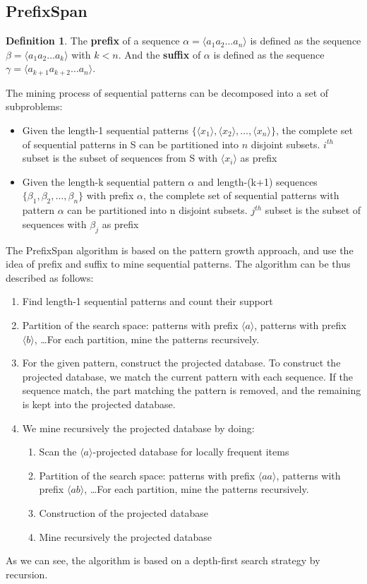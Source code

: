 \documentclass[12pt, openany]{report}
\theoremstyle{definition}
\newtheorem{definition}[thm]{Definition}
\begin{document}
\subsection{PrefixSpan} 
\begin{definition}
    The \textbf{prefix} of a sequence $\alpha = \langle a_1a_2 \dots a_n\rangle$ is defined as the sequence $\beta = \langle a_1a_2 \dots a_k\rangle$ with $k < n$. And the \textbf{suffix} of $\alpha$ is defined as the sequence $\gamma = \langle a_{k+1}a_{k+2} \dots a_n\rangle$.
\end{definition}
The mining process of sequential patterns can be decomposed into a set of subproblems: 
\begin{itemize}
    \item Given the length-1 sequential patterns $\{\langle x_1 \rangle, \langle x_2 \rangle, \dots, \langle x_n \rangle\}$, the complete set of sequential patterns in S can be partitioned into $n$ disjoint subsets. $i^{th}$ subset is the subset of sequences from S with $\langle x_i \rangle$ as prefix
    \item Given the length-k sequential pattern $\alpha$ and length-(k+1) sequences $\{\beta_1, \beta_2, \dots, \beta_n\}$ with prefix $\alpha$, the complete set of sequential patterns with pattern $\alpha$ can be partitioned into n disjoint subsets. $j^{th}$ subset is the subset of sequences with $\beta_j$ as prefix
\end{itemize}
The PrefixSpan algorithm is based on the pattern growth approach, and use the idea of prefix and suffix to mine sequential patterns. The algorithm can be thus described as follows:
\begin{enumerate}
    \item Find length-1 sequential patterns and count their support
    \item Partition of the search space: patterns with prefix $\langle a \rangle$, patterns with prefix $\langle b \rangle$, \dots For each partition, mine the patterns recursively.
    \item For the given pattern, construct the projected database. To construct the projected database, we match the current pattern with each sequence. If the sequence match, the part matching the pattern is removed, and the remaining is kept into the projected database.
    \item We mine recursively the projected database by doing:
    \begin{enumerate}
        \item Scan the $\langle a \rangle$-projected database for locally frequent items
        \item Partition of the search space: patterns with prefix $\langle aa \rangle$, patterns with prefix $\langle ab \rangle$, \dots For each partition, mine the patterns recursively.
        \item Construction of the projected database
        \item Mine recursively the projected database
    \end{enumerate}
\end{enumerate}
As we can see, the algorithm is based on a depth-first search strategy by recursion.
\end{document}
